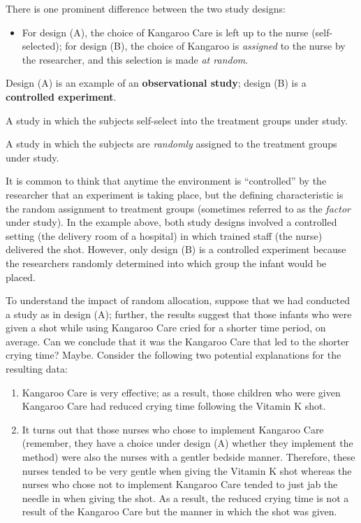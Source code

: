 \documentclass[]{book}
\providecommand{\tightlist}{%
  \setlength{\itemsep}{0pt}\setlength{\parskip}{0pt}}
\theoremstyle{definition}
\theoremstyle{definition}
\theoremstyle{definition}
\theoremstyle{remark}
\let\BeginKnitrBlock\begin \let\EndKnitrBlock\end
\begin{document}
There is one prominent difference between the two study designs:

\begin{itemize}
\tightlist
\item
  For design (A), the choice of Kangaroo Care is left up to the nurse
  (self-selected); for design (B), the choice of Kangaroo is
  \emph{assigned} to the nurse by the researcher, and this selection is
  made \emph{at random}.
\end{itemize}

Design (A) is an example of an \textbf{observational study}; design (B)
is a \textbf{controlled experiment}.

\BeginKnitrBlock{definition}[Observational Study]
\protect\hypertarget{def:defn-observational-study}{}{\label{def:defn-observational-study}
{} }A study in which the subjects
self-select into the treatment groups under study.
\EndKnitrBlock{definition}

\BeginKnitrBlock{definition}[Controlled Experiment]
\protect\hypertarget{def:defn-controlled-experiment}{}{\label{def:defn-controlled-experiment}
{} }A study in which the subjects
are \emph{randomly} assigned to the treatment groups under study.
\EndKnitrBlock{definition}

It is common to think that anytime the environment is ``controlled'' by
the researcher that an experiment is taking place, but the defining
characteristic is the random assignment to treatment groups (sometimes
referred to as the \emph{factor} under study). In the example above,
both study designs involved a controlled setting (the delivery room of a
hospital) in which trained staff (the nurse) delivered the shot.
However, only design (B) is a controlled experiment because the
researchers randomly determined into which group the infant would be
placed.

To understand the impact of random allocation, suppose that we had
conducted a study as in design (A); further, the results suggest that
those infants who were given a shot while using Kangaroo Care cried for
a shorter time period, on average. Can we conclude that it was the
Kangaroo Care that led to the shorter crying time? Maybe. Consider the
following two potential explanations for the resulting data:

\begin{enumerate}
\def\labelenumi{(\arabic{enumi})}
\tightlist
\item
  Kangaroo Care is very effective; as a result, those children who were
  given Kangaroo Care had reduced crying time following the Vitamin K
  shot.
\item
  It turns out that those nurses who chose to implement Kangaroo Care
  (remember, they have a choice under design (A) whether they implement
  the method) were also the nurses with a gentler bedside manner.
  Therefore, these nurses tended to be very gentle when giving the
  Vitamin K shot whereas the nurses who chose not to implement Kangaroo
  Care tended to just jab the needle in when giving the shot. As a
  result, the reduced crying time is not a result of the Kangaroo Care
  but the manner in which the shot was given.
\end{enumerate}
\end{document}
